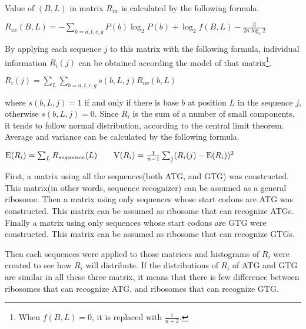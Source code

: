 Value of \((B,L)\) in matrix \(R_{iw}\) is calculated by the following 
formula.

\vspace{1em}

\begin{math}
R_{iw}(B,L) = -\sum_{b=a,t,c,g}P(b)\log_{2}P(b)
+ \log_{2}f(B,L) 
- \frac{3}{2n\log_{e}2}
\end{math}

\vspace{1em}

By applying each sequence \(j\) to this matrix with the following
formula, individual information \(R_{i}(j)\) can be obtained according
the model of that matrix\footnote{When \(f(B,L) = 0\), it is replaced
with \(\frac{1}{n+2}\).}.

\vspace{1em}

\begin{math}
R_{i}(j) = \sum_{L}\sum_{b=a,t,c,g}s(b,L,j)R_{iw}(b,L)
\end{math}

\vspace{1em}

\noindent
where \(s(b,L,j) = 1\) if and only if there is base \(b\) at position
\(L\) in the sequence \(j\), otherwise \(s(b,L,j) = 0\). 
Since \(R_{i}\) is the sum of a number of small components, it tends
to follow normal distribution, according to the central limit theorem.
Average and variance can be calculated by the following formula.

\vspace{1em}

\begin{math}
{\rm E}(R_{i}) = \sum_{L}R_{sequence}(L)\:\:\:\:\:\:\:\:\:{\rm V}(R_{i}) =
\frac{1}{n - 1}\sum_{j}(R_{i}(j) - {\rm E}(R_{i}))^{2}
\end{math}

\vspace{1em}

First, a matrix using all the sequences(both ATG, and GTG) was
constructed. This matrix(in other words, sequence recognizer) can be
assumed as a general ribosome. Then a matrix using only sequences whose
start codons are ATG was constructed. This matrix can be assumed as
ribosome that can recognize ATGs. Finally a matrix using only
sequences whose start codons are GTG were constructed. This matrix can
be assumed as ribosome that can recognize GTGs.

Then each sequences were applied to those matrices and histograms of
\(R_{i}\) were created to see how \(R_{i}\) will distribute. If the
distributions of \(R_{i}\) of ATG and GTG are similar in all these three
matrix, it means that there is few difference between ribosomes that can
recognize ATG, and ribosomes that can recognize GTG.

